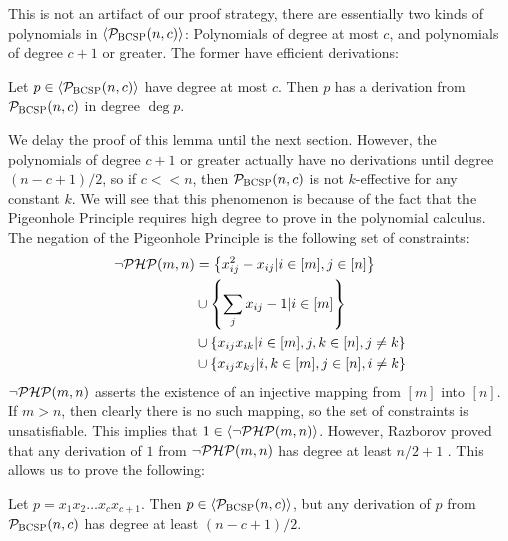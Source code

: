 This is not an artifact of our proof strategy, there are essentially two kinds of polynomials in $\langle \mathcal P_{\textsc{BCSP}}(n,c) \rangle$:
Polynomials of degree at most $c$, and polynomials of degree $c+1$ or greater. 
The former have efficient derivations:
\begin{lemma}\label{lem:bcsp-lowdeg}
Let $p \in \langle \mathcal P_{\textsc{BCSP}}(n,c) \rangle$ have degree at most $c$. Then $p$ has a derivation from $\mathcal P_{\textsc{BCSP}}(n,c)$ in degree $\deg p$.
\end{lemma}
We delay the proof of this lemma until the next section. 
However, the polynomials of degree $c+1$ or greater actually have no derivations until degree $(n-c+1)/2$, so if $c << n$, then $\mathcal P_{\textsc{BCSP}}(n,c)$ is not $k$-effective for any constant $k$.
We will see that this phenomenon is because of the fact that the Pigeonhole Principle requires high degree to prove in the polynomial calculus. 
The negation of the Pigeonhole Principle is the following set of constraints:
\begin{align*}
\neg\mathcal P\mathcal H\mathcal P(m,n) &= \left\{x_{ij}^2 - x_{ij} | i \in [m], j \in [n]\right\} \\
&\cup \left\{\sum_j x_{ij} - 1 | i \in [m]\right\} \\
&\cup \left\{x_{ij}x_{ik} | i \in [m], j,k \in [n], j \neq k\right\} \\
&\cup \left\{x_{ij}x_{kj} | i,k \in [m], j \in [n], i \neq k\right\}
\end{align*}
$\neg\mathcal P\mathcal H\mathcal P(m,n)$ asserts the existence of an injective mapping from $[m]$ into $[n]$. If $m > n$, then clearly there is no such mapping, so the set of constraints is unsatisfiable. This implies that $1 \in \langle \neg\mathcal P\mathcal H\mathcal P(m,n) \rangle$. However, Razborov proved that any derivation of $1$ from $\neg\mathcal P\mathcal H\mathcal P(m,n)$ has degree at least $n/2 + 1$ \cite{}.
This allows us to prove the following:
\begin{lemma}\label{lem:bcsp-highdeg-hard}
Let $p = x_1x_2\dots x_c x_{c+1}$. Then $p \in \langle \mathcal P_{\textsc{BCSP}}(n,c) \rangle$, but any derivation of $p$ from $\mathcal P_{\textsc{BCSP}}(n,c)$ has degree at least $(n-c+1)/2$. 
\end{lemma}
